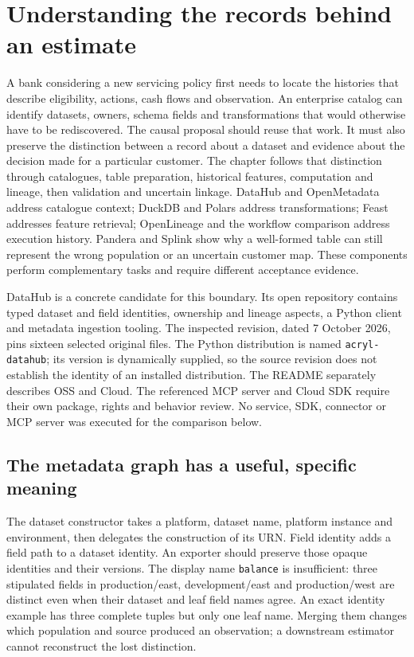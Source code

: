 \chapter{Understanding the records behind an estimate}
\label{exec16:datahub}

A bank considering a new servicing policy first needs to locate the histories
that describe eligibility, actions, cash flows and observation. An enterprise
catalog can identify datasets, owners, schema fields and transformations that
would otherwise have to be rediscovered. The causal proposal should reuse that
work. It must also preserve the distinction between a record about a dataset
and evidence about the decision made for a particular customer. The chapter follows that distinction through catalogues, table preparation, historical features, computation and lineage, then validation and uncertain linkage. DataHub and OpenMetadata address catalogue context; DuckDB and Polars address transformations; Feast addresses feature retrieval; OpenLineage and the workflow comparison address execution history. Pandera and Splink show why a well-formed table can still represent the wrong population or an uncertain customer map. These components perform complementary tasks and require different acceptance evidence.

DataHub is a concrete candidate for this boundary. Its open repository contains
typed dataset and field identities, ownership and lineage aspects, a Python
client and metadata ingestion tooling. The inspected revision, dated 7 October
2026, pins sixteen selected original files. The Python distribution is named
\texttt{acryl-datahub}; its version is dynamically supplied, so the source
revision does not establish the identity of an installed distribution. The
README separately describes OSS and Cloud. The referenced MCP server and
Cloud SDK require their own package, rights and behavior review. No service,
SDK, connector or MCP server was executed for the comparison below.
\citep{exec16_dh_primary,exec16_dh_rights}

\section{The metadata graph has a useful, specific meaning}

The dataset constructor takes a platform, dataset name, platform instance and
environment, then delegates the construction of its URN. Field identity adds
a field path to a dataset identity. An exporter should preserve those opaque
identities and their versions. The display name \texttt{balance} is insufficient:
three stipulated fields in production/east, development/east and production/west
are distinct even when their dataset and leaf field names agree. An exact
identity example has three complete tuples but only one leaf name. Merging
them changes which population and source produced an observation; a downstream
estimator cannot reconstruct the lost distinction.
\citep{exec16_dh_primary,exec16_dh_exact}

